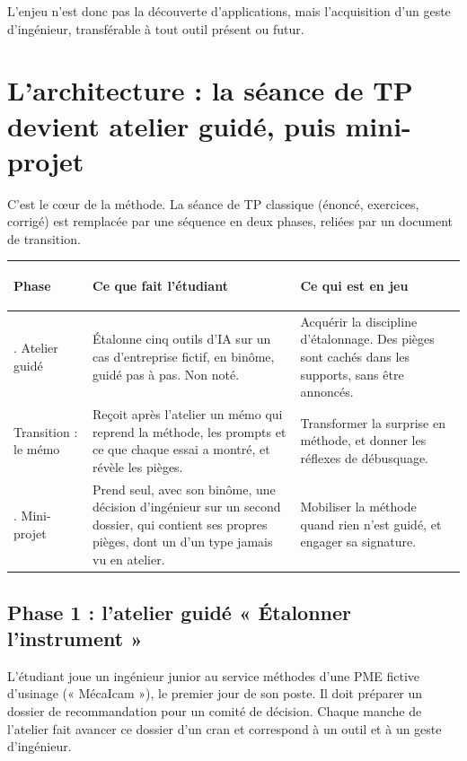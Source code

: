 \documentclass[11pt,a4paper]{article}
\begin{document}
L'enjeu n'est donc pas la découverte d'applications, mais l'acquisition d'un geste
d'ingénieur, transférable à tout outil présent ou futur.

\section{L'architecture : la séance de TP devient atelier guidé, puis mini-projet}

C'est le cœur de la méthode. La séance de TP classique (énoncé, exercices, corrigé) est remplacée
par une séquence en deux phases, reliées par un document de transition.

\begin{center}
\renewcommand{\arraystretch}{1.45}
\begin{tabularx}{\linewidth}{>{\bfseries\raggedright\arraybackslash}p{3.3cm} >{\raggedright\arraybackslash}X >{\raggedright\arraybackslash}X}
\toprule
\textbf{Phase} & \textbf{Ce que fait l'étudiant} & \textbf{Ce qui est en jeu}\\
\midrule
1. Atelier guidé & Étalonne cinq outils d'IA sur un cas d'entreprise fictif, en binôme, guidé pas à pas. Non noté. & Acquérir la discipline d'étalonnage. Des pièges sont cachés dans les supports, sans être annoncés.\\
Transition : le mémo & Reçoit après l'atelier un mémo qui reprend la méthode, les prompts et ce que chaque essai a montré, et révèle les pièges. & Transformer la surprise en méthode, et donner les réflexes de débusquage.\\
2. Mini-projet & Prend seul, avec son binôme, une décision d'ingénieur sur un second dossier, qui contient ses propres pièges, dont un d'un type jamais vu en atelier. & Mobiliser la méthode quand rien n'est guidé, et engager sa signature.\\
\bottomrule
\end{tabularx}
\end{center}

\subsection{Phase 1 : l'atelier guidé « Étalonner l'instrument »}

L'étudiant joue un ingénieur junior au service méthodes d'une PME fictive d'usinage
(« MécaIcam »), le premier jour de son poste. Il doit préparer un dossier de recommandation pour
un comité de décision. Chaque manche de l'atelier fait avancer ce dossier d'un cran et
correspond à un outil et à un geste d'ingénieur.
\end{document}
